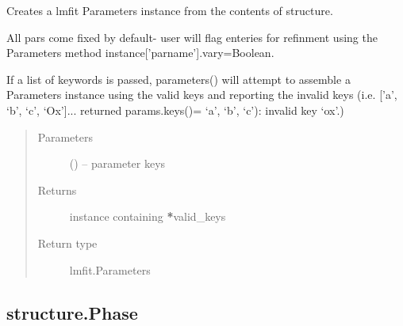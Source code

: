 \documentclass[letterpaper,10pt,english]{sphinxmanual}
\begin{document}
\begin{fulllineitems}
\begin{fulllineitems}
\label{\detokenize{rst/structure:mstack.structure.Structure.parameters}}
Creates a lmfit Parameters instance from the contents of structure.

All pars come fixed by default- user will flag enteries for
refinment using the Parameters method instance{[}'parname'{]}.vary=Boolean.

If a list of keywords is passed, parameters() will attempt to assemble a
Parameters instance using the valid keys and reporting the invalid keys
(i.e. {[}'a', `b', `c', `Ox'{]}... returned params.keys()= `a', `b', `c'): invalid
key `ox'.)
\begin{quote}\begin{description}
\item[{Parameters}] \leavevmode
{} (\sphinxstyleliteralemphasis{, }) -- parameter keys

\item[{Returns}] \leavevmode
instance containing {\color{red}\bfseries{}*}valid\_keys

\item[{Return type}] \leavevmode
lmfit.Parameters

\end{description}\end{quote}

\end{fulllineitems}


\end{fulllineitems}



\subsection{structure.Phase}
\label{\detokenize{rst/structure:structure-phase}}
\end{document}

